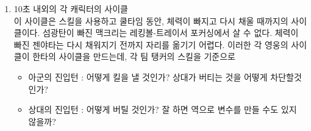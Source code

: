 \begin{enumerate}
    \item 10초 내외의 각 캐릭터의 사이클\label{cyc:1}\\
    이 사이클은 스킬을 사용하고 쿨타임 동안, 체력이 빠지고 다시 채울 때까지의 사이클이다. 섬광탄이 빠진 맥크리는 레킹볼-트레이서 포커싱에서 살 수 없다. 체력이 빠진 젠야타는 다시 채워지기 전까지 자리를 옮기기 어렵다. 이러한 각 영웅의 사이클이 한타의 사이클을 만드는데, 각 팀 탱커의 스킬을 기준으로
    \begin{itemize}
        \item 아군의 진입턴 : 어떻게 킬을 낼 것인가? 상대가 버티는 것을 어떻게 차단할것인가?
        \item 상대의 진입턴 : 어떻게 버틸 것인가? 잘 하면 역으로 변수를 만들 수도 있지 않을까?
    \end{itemize}
        

\end{enumerate}
